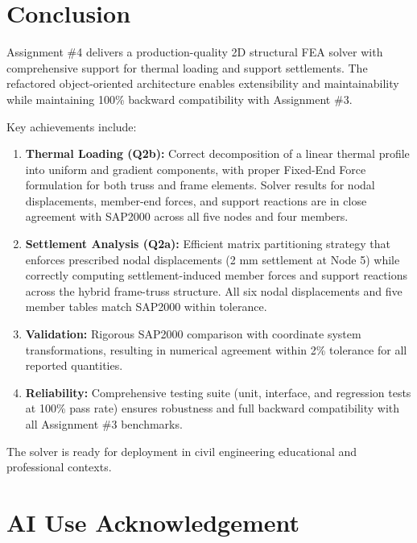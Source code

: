 \documentclass[12pt,a4paper]{article}
\begin{document}

\section{Conclusion}

Assignment \#4 delivers a production-quality 2D structural FEA solver with comprehensive support for thermal loading and support settlements. The refactored object-oriented architecture enables extensibility and maintainability while maintaining 100\% backward compatibility with Assignment \#3.

Key achievements include:

\begin{enumerate}
    \item \textbf{Thermal Loading (Q2b):} Correct decomposition of a linear thermal profile into uniform and gradient components, with proper Fixed-End Force formulation for both truss and frame elements. Solver results for nodal displacements, member-end forces, and support reactions are in close agreement with SAP2000 across all five nodes and four members.
    \item \textbf{Settlement Analysis (Q2a):} Efficient matrix partitioning strategy that enforces prescribed nodal displacements (2 mm settlement at Node 5) while correctly computing settlement-induced member forces and support reactions across the hybrid frame-truss structure. All six nodal displacements and five member tables match SAP2000 within tolerance.
    \item \textbf{Validation:} Rigorous SAP2000 comparison with coordinate system transformations, resulting in numerical agreement within 2\% tolerance for all reported quantities.
    \item \textbf{Reliability:} Comprehensive testing suite (unit, interface, and regression tests at 100\% pass rate) ensures robustness and full backward compatibility with all Assignment \#3 benchmarks.
\end{enumerate}

The solver is ready for deployment in civil engineering educational and professional contexts.


\section{AI Use Acknowledgement}
\end{document}
